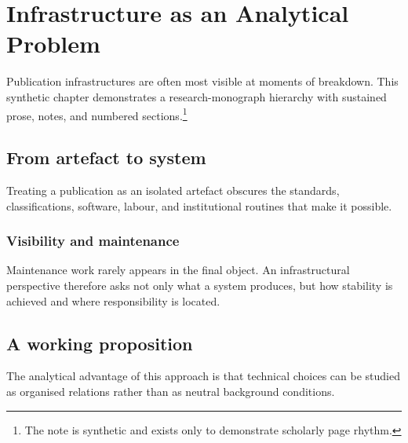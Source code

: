 \chapter{Infrastructure as an Analytical Problem}
Publication infrastructures are often most visible at moments of breakdown. This synthetic chapter demonstrates a research-monograph hierarchy with sustained prose, notes, and numbered sections.\footnote{The note is synthetic and exists only to demonstrate scholarly page rhythm.}

\section{From artefact to system}
Treating a publication as an isolated artefact obscures the standards, classifications, software, labour, and institutional routines that make it possible.

\subsection{Visibility and maintenance}
Maintenance work rarely appears in the final object. An infrastructural perspective therefore asks not only what a system produces, but how stability is achieved and where responsibility is located.

\section{A working proposition}
The analytical advantage of this approach is that technical choices can be studied as organised relations rather than as neutral background conditions.

